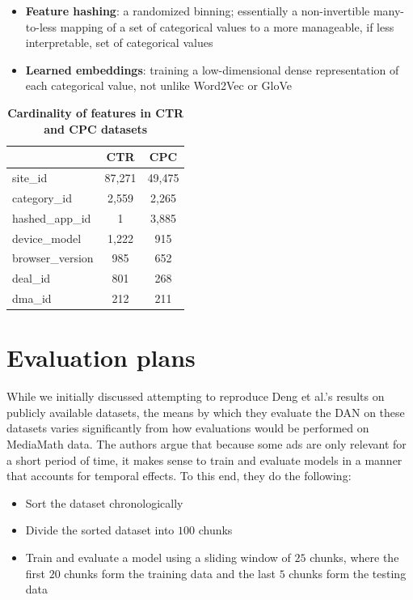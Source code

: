\documentclass{proc}
\begin{document}
\begin{itemize}
\item{\textbf{Feature hashing}}: a randomized binning; essentially a non-invertible many-to-less mapping of a set of categorical values to a more manageable, if less interpretable, set of categorical values
\item{\textbf{Learned embeddings}}: training a low-dimensional dense representation of each categorical value, not unlike Word2Vec or GloVe
\end{itemize}

\begin{table}[]
\begin{center}
	\begin{tabular}{|l|c|c|}
		\hline
 		&  \textbf{CTR} & \textbf{CPC}\\ \hline
 		site\_id & 87,271 & 49,475 \\ \hline
 		category\_id & 2,559 & 2,265\\ \hline
		hashed\_app\_id & 1 & 3,885\\ \hline
		device\_model & 1,222 & 915 \\ \hline
		browser\_version & 985 & 652\\ \hline
		deal\_id & 801 & 268\\ \hline
		dma\_id & 212 & 211\\ \hline
	\end{tabular}
	\caption{\textbf{Cardinality of features in CTR and CPC datasets}}
	\label{table:dataset-cardinality}
\end{center}
\end{table}

\section{Evaluation plans}

While we initially discussed attempting to reproduce Deng et al.'s results on publicly available datasets, the means by which they evaluate the DAN on these datasets varies significantly from how evaluations would be performed on MediaMath data. The authors argue that because some ads are only relevant for a short period of time, it makes sense to train and evaluate models in a manner that accounts for temporal effects. To this end, they do the following:

\begin{itemize}
\item{Sort the dataset chronologically}
\item{Divide the sorted dataset into $100$ chunks}
\item{Train and evaluate a model using a sliding window of $25$ chunks, where the first $20$ chunks form the training data and the last $5$ chunks form the testing data}
\end{itemize}
\end{document}
